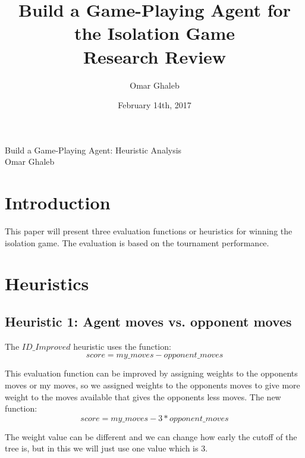 \documentclass[10pt, a4paper,english]{article}
\author{\normalsize{Omar Ghaleb}}
\date{\normalsize{February 14th, 2017}} %
\title{
Build a Game-Playing Agent for the Isolation Game \\
\large {Research Review}
} %
\begin{document}
\begin{center}

Build a Game-Playing Agent: Heuristic Analysis \\
Omar Ghaleb \\
\end{center}

\section{Introduction}

This paper will present three evaluation functions or heuristics for winning the isolation game. The evaluation is based on the tournament performance.
%

\section{Heuristics}

\subsection{Heuristic 1: Agent moves vs. opponent moves}


The $ID\_Improved$ heuristic uses the function:
	$$score = my\_moves - opponent\_moves$$

This evaluation function can be improved by assigning weights to the opponents moves or my moves, so we assigned weights to the opponents moves to give more weight to the moves available that gives the opponents less moves. The new function:
	$$score = my\_moves - 3*opponent\_moves$$

The weight value can be different and we can change how early the cutoff of the tree is, but in this we will just use one value which is $3$.
\end{document}
